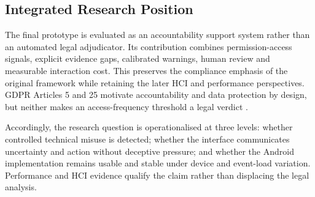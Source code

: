 
\subsection{Integrated Research Position}

The final prototype is evaluated as an accountability support system rather than an automated legal adjudicator. Its contribution combines permission-access signals, explicit evidence gaps, calibrated warnings, human review and measurable interaction cost. This preserves the compliance emphasis of the original framework while retaining the later HCI and performance perspectives. GDPR Articles 5 and 25 motivate accountability and data protection by design, but neither makes an access-frequency threshold a legal verdict \cite{eurlex2016,edpb2019}.

Accordingly, the research question is operationalised at three levels: whether controlled technical misuse is detected; whether the interface communicates uncertainty and action without deceptive pressure; and whether the Android implementation remains usable and stable under device and event-load variation. Performance and HCI evidence qualify the claim rather than displacing the legal analysis.

